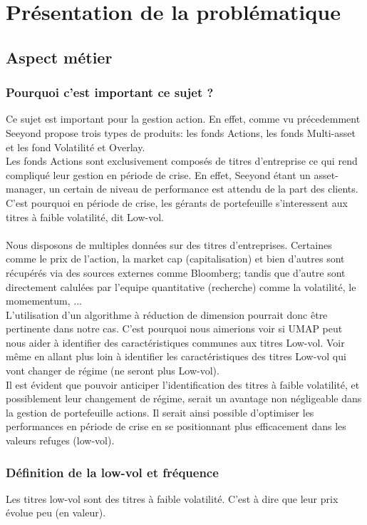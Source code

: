 \chapter{Présentation de la problématique}

\section{Aspect métier}

\subsection{Pourquoi c'est important ce sujet ?}
Ce sujet est important pour la gestion action. En effet, comme vu précedemment Seeyond propose trois types de produits: les fonds Actions, les fonds Multi-asset et les fond Volatilité et Overlay.
\\
Les fonds Actions sont exclusivement composés de titres d'entreprise ce qui rend compliqué leur gestion en période de crise. En effet, Seeyond étant un asset-manager, un certain de niveau de performance est attendu de la part des clients. C'est pourquoi en période de crise, les gérants de portefeuille s'interessent aux titres à faible volatilité, dit Low-vol.
\\
\\
Nous disposons de multiples données sur des titres d'entreprises. Certaines comme le prix de l'action, la market cap (capitalisation) et bien d'autres sont récupérés via des sources externes comme Bloomberg; tandis que d'autre sont directement calulées par l'equipe quantitative (recherche) comme la volatilité, le momementum, ...
\\
L'utilisation d'un algorithme à réduction de dimension pourrait donc être pertinente dans notre cas. C'est pourquoi nous aimerions voir si UMAP peut nous aider à identifier des caractéristiques communes aux titres Low-vol. Voir même en allant plus loin à identifier les caractéristiques des titres Low-vol qui vont changer de régime (ne seront plus Low-vol).
\\
Il est évident que pouvoir anticiper l'identification des titres à faible volatilité, et possiblement leur changement de régime, serait un avantage non négligeable dans la gestion de portefeuille actions. Il serait ainsi possible d'optimiser les performances en période de crise en se positionnant plus efficacement dans les valeurs refuges (low-vol).

\subsection{Définition de la low-vol et fréquence}
Les titres low-vol sont des titres à faible volatilité. C'est à dire que leur prix évolue peu (en valeur).


